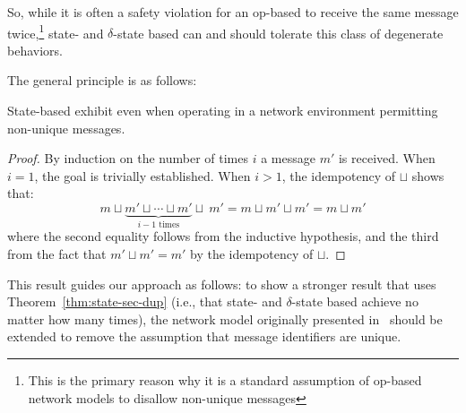 So, while it is often a safety violation for an op-based \CRDT to receive the
same message twice,\footnote{This is the primary reason why it is a standard
assumption of op-based network models to disallow non-unique messages}
state- and $\delta$-state based \CRDTs can and should tolerate this class of
degenerate behaviors.

The general principle is as follows:
\begin{theorem} \label{thm:state-sec-dup}
  State-based \CRDTs exhibit \SEC even when operating in
  a network environment permitting non-unique messages.
\end{theorem}
\begin{proof}
  By induction on the number of times $i$ a message $m'$ is received. When $i =
  1$, the goal is trivially established. When $i > 1$, the idempotency of
  $\sqcup$ shows that:
  \[
    m \sqcup \underbrace{m' \sqcup \cdots \sqcup m'}_{\text{$i-1$ times}} \sqcup~m'
      = m \sqcup m' \sqcup m'
      = m \sqcup m'
  \]
  where the second equality follows from the inductive hypothesis, and the third
  from the fact that $m' \sqcup m' = m'$ by the idempotency of $\sqcup$.
\end{proof}

This result guides our approach as follows: to show a stronger result that uses
Theorem~\ref{thm:state-sec-dup} (i.e., that state- and $\delta$-state based
\CRDTs achieve \SEC no matter how many times), the network model originally
presented in~\citet{gomes17} should be extended to remove the assumption that
message identifiers are unique.


